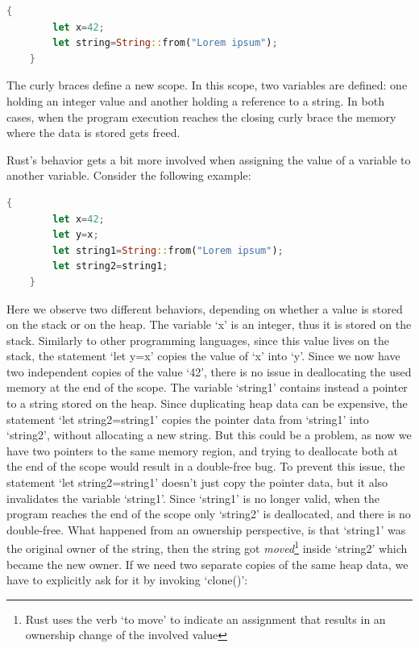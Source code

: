 \documentclass{report}
\begin{document}
\begin{lstlisting}[language=Rust, style=colouredRust]
	{
		let x=42;
		let string=String::from("Lorem ipsum");
	}
\end{lstlisting}

The curly braces define a new scope. In this scope, two variables are defined: one holding an integer value and another holding a reference to a string. In both cases, when the
program execution reaches the closing curly brace the memory where the data is stored gets freed. \par
Rust's behavior gets a bit more involved when assigning the value of a variable to another variable. Consider the following example:

\begin{lstlisting}[language=Rust, style=colouredRust]
	{
		let x=42;
		let y=x;
		let string1=String::from("Lorem ipsum");
		let string2=string1;
	}
\end{lstlisting}

Here we observe two different behaviors, depending on whether a value is stored on the stack or on the heap. The variable \enquote*{x} is an integer, thus it is stored on the
stack. Similarly to other programming languages, since this value lives on the stack, the statement \enquote*{let y=x} copies the value of \enquote*{x} into \enquote*{y}. Since we
now have two independent copies of the value \enquote*{42}, there is no issue in deallocating the used memory at the end of the scope. The variable \enquote*{string1} contains instead
a pointer to a string stored on the heap. Since duplicating heap data can be expensive, the statement \enquote*{let string2=string1} copies the pointer data from
\enquote*{string1} into \enquote*{string2}, without allocating a new string. But this could be a problem, as now we have two pointers to the same memory region, and trying to deallocate both at the end of the
scope would result in a double-free bug. To prevent this issue, the statement \enquote*{let string2=string1} doesn't just copy the pointer data, but it also invalidates the
variable \enquote*{string1}. Since \enquote*{string1} is no longer valid, when the program reaches the end of the scope only \enquote*{string2} is deallocated, and there is no
double-free. What happened from an ownership perspective, is that \enquote*{string1} was the original owner of the string, then the string got \textit{moved}\footnote{Rust uses
the verb \enquote*{to move} to indicate an assignment that results in an ownership change of the involved value} inside \enquote*{string2} which
became the new owner. If we need two separate copies of the same heap data, we have to explicitly ask for it by invoking \enquote*{clone()}:
\end{document}
